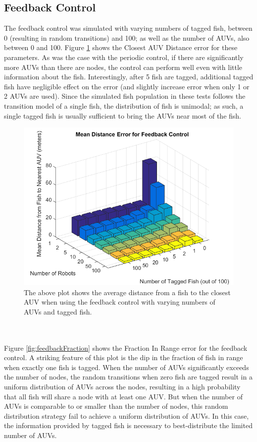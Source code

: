 \documentclass[11pt,letterpaper]{article}
\begin{document}
	\subsection{Feedback Control}
	
	The feedback control was simulated with varying numbers of tagged fish, between 0 (resulting in random transitions) and 100; as well as the number of AUVs, also between 0 and 100. Figure \ref{fig:feedbackMeanDistance} shows the Closest AUV Distance error for these parameters. As was the case with the periodic control, if there are significantly more AUVs than there are nodes, the control can perform well even with little information about the fish. Interestingly, after 5 fish are tagged, additional tagged fish have negligible effect on the error (and slightly increase error when only 1 or 2 AUVs are used). Since the simulated fish population in these tests follows the transition model of a single fish, the distribution of fish is unimodal; as such, a single tagged fish is usually sufficient to bring the AUVs near most of the fish.
	\begin{figure}
		\centering
		\includegraphics[width = 0.7\linewidth]{results/feedbackMeanDistance}
		\caption{The above plot shows the average distance from a fish to the closest AUV when using the feedback control with varying numbers of AUVs and tagged fish.}
		\label{fig:feedbackMeanDistance}
	\end{figure}
	\\\\
	Figure \ref{fig:feedbackFraction} shows the Fraction In Range error for the feedback control. A striking feature of this plot is the dip in the fraction of fish in range when exactly one fish is tagged. When the number of AUVs significantly exceeds the number of nodes, the random transitions when zero fish are tagged result in a uniform distribution of AUVs across the nodes, resulting in a high probability that all fish will share a node with at least one AUV. But when the number of AUVs is comparable to or smaller than the number of nodes, this random distribution strategy fail to achieve a uniform distribution of AUVs. In this case, the information provided by tagged fish is necessary to best-distribute the limited number of AUVs.
\end{document}
